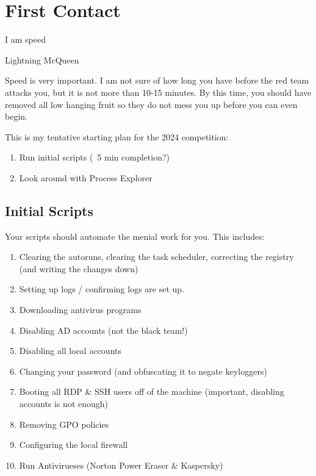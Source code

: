 \documentclass{article}
\begin{document}
\section{First Contact}
\epigraph{I am speed}{Lightning McQueen}

Speed is very important. I am not sure of how long you have before the red team attacks you, but it is not more than 10-15 minutes.
By this time, you should have removed all low hanging fruit so they do not mess you up before you can even begin.

This is my tentative starting plan for the 2024 competition:
\begin{enumerate}
        \item Run initial scripts (~5 min completion?)
        \item Look around with Process Explorer
\end{enumerate}

\subsection{Initial Scripts}
Your scripts should automate the menial work for you. This includes:
\begin{enumerate}
        \item Clearing the autoruns, clearing the task scheduler, correcting the registry (and writing the changes down)
        \item Setting up logs / confirming logs are set up.
        \item Downloading antivirus programs
        \item Disabling AD accounts (not the black team!)
        \item Disabling all local accounts
        \item Changing your password (and obfuscating it to negate keyloggers)
        \item Booting all RDP \& SSH users off of the machine (important, disabling accounts is not enough)
        \item Removing GPO policies
        \item Configuring the local firewall
        \item Run Antivirueses (Norton Power Eraser \& Kaspersky)
\end{enumerate}
\end{document}
